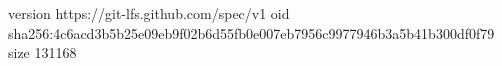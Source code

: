 version https://git-lfs.github.com/spec/v1
oid sha256:4c6acd3b5b25e09eb9f02b6d55fb0e007eb7956c9977946b3a5b41b300df0f79
size 131168
